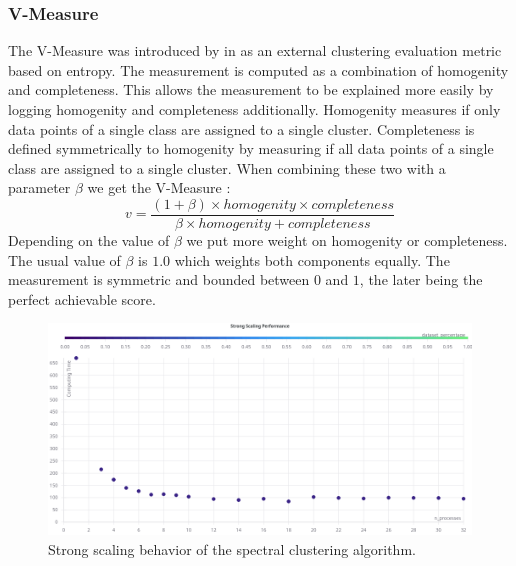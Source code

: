 \subsubsection{V-Measure}
\label{ssec:v_measure}
The V-Measure was introduced by \citeauthor{rosenberg_v-measure_2007} in \cite{rosenberg_v-measure_2007} as an external clustering evaluation metric based on entropy.
The measurement is computed as a combination of homogenity and completeness. This allows the measurement to be explained more easily by logging homogenity and completeness additionally.
Homogenity measures if only data points of a single class are assigned to a single cluster. Completeness is defined symmetrically to homogenity by measuring if all data points of a single class are assigned to
a single cluster.
When combining these two with a parameter \(\beta\) we get the V-Measure \cite{noauthor_23_2020}:
\[v = \frac{(1 + \beta) \times \mathit{homogenity} \times \mathit{completeness}}{\beta \times \mathit{homogenity} + \mathit{completeness}}\]
Depending on the value of \(\beta\) we put more weight on homogenity or completeness. The usual value of \(\beta\) is \(1.0\) which weights both components equally.
The measurement is symmetric and bounded between \(0\) and \(1\), the later being the perfect achievable score.



\begin{figure}
  \includegraphics[width=0.9\linewidth]{images/strong_scaling_chart.png}
  \caption{Strong scaling behavior of the spectral clustering algorithm.}\label{fig:strong_scaling}
\end{figure}
